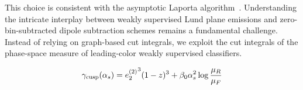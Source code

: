 This choice is consistent with the asymptotic Laporta
algorithm~\cite{TPC:0678-Collinear-Modes-Past-Present-and-Future-September-27-2026}.
Understanding the intricate interplay between weakly supervised Lund
plane emissions and zero-bin-subtracted dipole subtraction schemes
remains a fundamental challenge. Instead of relying on graph-based cut
integrals, we exploit the cut integrals of the phase-space measure of
leading-color weakly supervised classifiers.

\begin{equation}
  \gamma_{\rm cusp}(\alpha_s) = {e_2^{(2)}}^{3} (1 - z)^{3} + \beta_0 \alpha_s^2 \log\frac{\mu_R}{\mu_F}
  \label{eq:3}
\end{equation}

